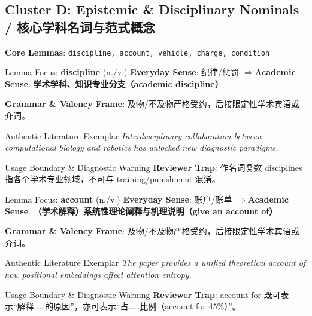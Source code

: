 \subsection{Cluster D: Epistemic \& Disciplinary Nominals / 核心学科名词与范式概念}
\noindent\textbf{\color{AcadSlate}Core Lemmas}: \texttt{discipline, account, vehicle, charge, condition}\par\vspace{4pt}
\begin{ConceptBox}{Lemma Focus: \textbf{discipline} (n./v.)}
\textbf{Everyday Sense}: 纪律/惩罚 \quad$\Longrightarrow$\quad \textbf{Academic Sense}: \textbf{学术学科、知识专业分支（academic discipline）}\par\vspace{3pt}
\textbf{Grammar \& Valency Frame}: 及物/不及物严格受约，后接限定性学术宾语或介词。\par
\end{ConceptBox}
\begin{ExampleBox}{Authentic Literature Exemplar}
\textit{Interdisciplinary collaboration between computational biology and robotics has unlocked new diagnostic paradigms.}
\end{ExampleBox}
\begin{TipBox}{Usage Boundary \& Diagnostic Warning}
\textbf{Reviewer Trap}: 作名词复数 disciplines 指各个学术专业领域，不可与 training/punishment 混淆。
\end{TipBox}
\vspace{6pt}
\begin{ConceptBox}{Lemma Focus: \textbf{account} (n./v.)}
\textbf{Everyday Sense}: 账户/账单 \quad$\Longrightarrow$\quad \textbf{Academic Sense}: \textbf{（学术解释）系统性理论阐释与机理说明（give an account of）}\par\vspace{3pt}
\textbf{Grammar \& Valency Frame}: 及物/不及物严格受约，后接限定性学术宾语或介词。\par
\end{ConceptBox}
\begin{ExampleBox}{Authentic Literature Exemplar}
\textit{The paper provides a unified theoretical account of how positional embeddings affect attention entropy.}
\end{ExampleBox}
\begin{TipBox}{Usage Boundary \& Diagnostic Warning}
\textbf{Reviewer Trap}: account for 既可表示“解释……的原因”，亦可表示“占……比例（account for 45\%）”。
\end{TipBox}
\vspace{6pt}
